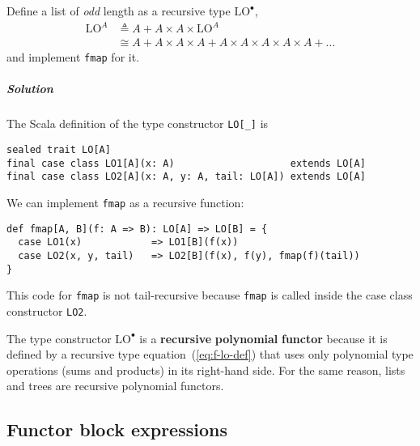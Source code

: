Define a list of \emph{odd} length as a recursive type $\text{LO}^{\bullet}$,
\begin{align}
\text{LO}^{A} & \triangleq A+A\times A\times\text{LO}^{A}\label{eq:f-lo-def}\\
 & \cong A+A\times A\times A+A\times A\times A\times A\times A+...\nonumber 
\end{align}
and implement \lstinline!fmap! for it.

\subparagraph{Solution}

The Scala definition of the type constructor \lstinline!LO[_]! is

\begin{lstlisting}
sealed trait LO[A]
final case class LO1[A](x: A)                    extends LO[A]
final case class LO2[A](x: A, y: A, tail: LO[A]) extends LO[A]
\end{lstlisting}

We can implement \lstinline!fmap! as a recursive function:
\begin{lstlisting}
def fmap[A, B](f: A => B): LO[A] => LO[B] = {
  case LO1(x)            => LO1[B](f(x))
  case LO2(x, y, tail)   => LO2[B](f(x), f(y), fmap(f)(tail))
}
\end{lstlisting}
This code for \lstinline!fmap! is not tail-recursive because \lstinline!fmap!
is called inside the case class constructor \lstinline!LO2!. 

The type constructor $\text{LO}^{\bullet}$ is a \textbf{recursive}
\textbf{polynomial} \textbf{functor}
because it is defined by a recursive type equation~(\ref{eq:f-lo-def})
that uses only polynomial type operations (sums and products) in its
right-hand side. For the same reason, lists and trees are recursive
polynomial functors.

\subsection{Functor block expressions}

